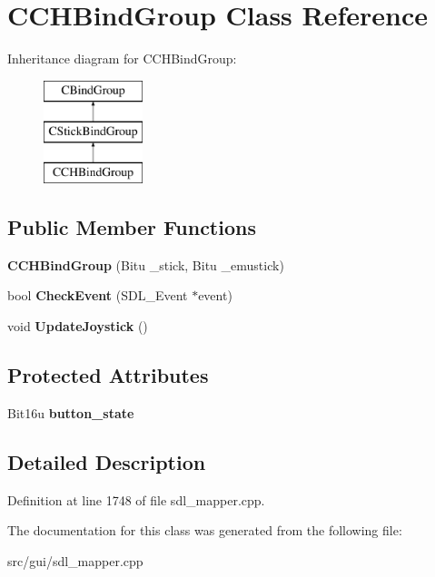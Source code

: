 \hypertarget{classCCHBindGroup}{\section{C\-C\-H\-Bind\-Group Class Reference}
\label{classCCHBindGroup}
}
Inheritance diagram for C\-C\-H\-Bind\-Group\-:\begin{figure}[H]
\begin{center}
\leavevmode
\includegraphics[height=3.000000cm]{classCCHBindGroup}
\end{center}
\end{figure}
\subsection*{Public Member Functions}
\begin{DoxyCompactItemize}
\item 
\hypertarget{classCCHBindGroup_a86bb3a7458f395324aae896cbe02f4dd}{{\bfseries C\-C\-H\-Bind\-Group} (Bitu \-\_\-stick, Bitu \-\_\-emustick)}\label{classCCHBindGroup_a86bb3a7458f395324aae896cbe02f4dd}

\item 
\hypertarget{classCCHBindGroup_a33b9f9ced9bf284c83219c33aa81bfe0}{bool {\bfseries Check\-Event} (S\-D\-L\-\_\-\-Event $\ast$event)}\label{classCCHBindGroup_a33b9f9ced9bf284c83219c33aa81bfe0}

\item 
\hypertarget{classCCHBindGroup_a11232134bcf2b6f8257f8103d34d2a13}{void {\bfseries Update\-Joystick} ()}\label{classCCHBindGroup_a11232134bcf2b6f8257f8103d34d2a13}

\end{DoxyCompactItemize}
\subsection*{Protected Attributes}
\begin{DoxyCompactItemize}
\item 
\hypertarget{classCCHBindGroup_a0d3a52894ed32833a5942a5b0e507c56}{Bit16u {\bfseries button\-\_\-state}}\label{classCCHBindGroup_a0d3a52894ed32833a5942a5b0e507c56}

\end{DoxyCompactItemize}


\subsection{Detailed Description}


Definition at line 1748 of file sdl\-\_\-mapper.\-cpp.



The documentation for this class was generated from the following file\-:\begin{DoxyCompactItemize}
\item 
src/gui/sdl\-\_\-mapper.\-cpp\end{DoxyCompactItemize}
